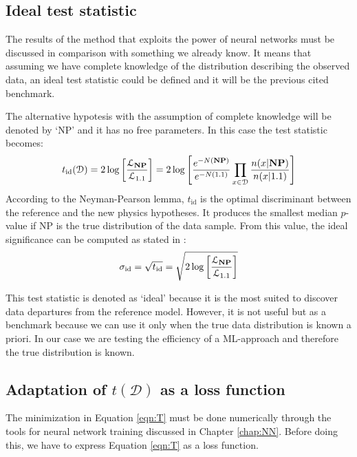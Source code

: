 \subsection{Ideal test statistic}
The results of the method that exploits the power of neural networks must be discussed in comparison with something we already know. It means that assuming we have complete knowledge of the distribution describing the observed data, an ideal test statistic could be defined and it will be the previous cited benchmark.

The alternative hypotesis with the assumption of complete knowledge will be denoted by `NP' and it has no free parameters. In this case the test statistic becomes:
\begin{equation}
	t_\mathrm{id}(\mathcal{D})
	=
	2 \log{\left[
	\frac{\mathcal{L}_{\text{\textbf{NP}}}}{\mathcal{L}_{1.1}}
	\right]}
	=	
	2 \log{ 
	\left[
	\frac{e^{-N(\text{\textbf{NP}})}}{e^{-N(1.1)}}
	\prod_{x \in \mathcal{D}} \frac{n(x|\text{\textbf{NP}})}{n(x|1.1)}
	\right]
	}
\end{equation}
According to the Neyman-Pearson lemma, $t_\mathrm{id}$ is the optimal discriminant between the reference and the new physics hypotheses. It produces the smallest median $p$-value if NP is the true distribution of the data sample. From this value, the ideal significance can be computed as stated in \cite{cowan}:
\begin{equation}
	\sigma_\mathrm{id}
	=
	\sqrt{t_\mathrm{id}}
	=	
	\sqrt{
	2 \log{\left[
	\frac{\mathcal{L}_{\text{\textbf{NP}}}}{\mathcal{L}_{1.1}}
	\right]}
	}	\label{eqn:ID_SIG}
\end{equation}

This test statistic is denoted as `ideal' because it is the most suited to discover data departures from the reference model. However, it is not useful but as a benchmark because we can use it only when the true data distribution is known a priori. In our case we are testing the efficiency of a ML-approach and therefore the true distribution is known.



\subsection{Adaptation of $t(\mathcal{D})$ as a loss function}
The minimization in Equation \ref{eqn:T} must be done numerically through the tools for neural network training discussed in Chapter \ref{chap:NN}. Before doing this, we have to express Equation \ref{eqn:T} as a loss function.

